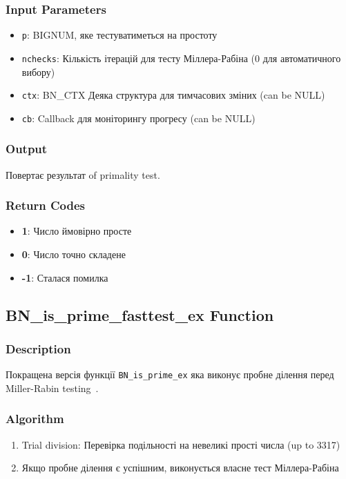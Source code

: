 \subsubsection{Input Parameters}
\begin{itemize}
    \item \texttt{p}: BIGNUM, яке тестуватиметься на простоту
    \item \texttt{nchecks}: Кількість ітерацій для тесту Міллера-Рабіна (0 для автоматичного вибору)
    \item \texttt{ctx}: BN\_CTX Деяка структура для тимчасових зміних (can be NULL)
    \item \texttt{cb}: Callback для моніторингу прогресу (can be NULL)
\end{itemize}

\subsubsection{Output}
Повертає результат of primality test.

\subsubsection{Return Codes}
\begin{itemize}
    \item \textbf{1}: Число ймовірно просте
    \item \textbf{0}: Число точно складене
    \item \textbf{-1}: Сталася помилка
\end{itemize}

\subsection{BN\_is\_prime\_fasttest\_ex Function}

\subsubsection{Description}
Покращена версія функції \texttt{BN\_is\_prime\_ex} яка виконує пробне ділення перед Miller-Rabin testing~\cite{crandall2005prime}.

\subsubsection{Algorithm}
\begin{enumerate}
    \item Trial division: Перевірка подільності на невеликі прості числа (up to 3317)
    \item Якщо пробне ділення є успішним, виконується власне тест Міллера-Рабіна
\end{enumerate}

